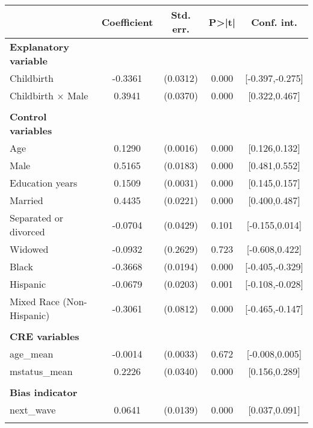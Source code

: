 {
\def\sym#1{\ifmmode^{#1}\else\(^{#1}\)\fi}
\begin{tabular}{l*{1}{cccc}}
\toprule
                    & Coefficient&   Std. err.&       P>|t|&  Conf. int.\\
\midrule
\textbf{Explanatory variable}&            &            &            &            \\
Childbirth          &     -0.3361&    (0.0312)&       0.000&[-0.397,-0.275]\\
Childbirth $\times$ Male&      0.3941&    (0.0370)&       0.000&[0.322,0.467]\\
\\ \textbf{Control variables}&            &            &            &            \\
Age                 &      0.1290&    (0.0016)&       0.000&[0.126,0.132]\\
Male                &      0.5165&    (0.0183)&       0.000&[0.481,0.552]\\
Education years     &      0.1509&    (0.0031)&       0.000&[0.145,0.157]\\
Married             &      0.4435&    (0.0221)&       0.000&[0.400,0.487]\\
Separated or divorced&     -0.0704&    (0.0429)&       0.101&[-0.155,0.014]\\
Widowed             &     -0.0932&    (0.2629)&       0.723&[-0.608,0.422]\\
Black               &     -0.3668&    (0.0194)&       0.000&[-0.405,-0.329]\\
Hispanic            &     -0.0679&    (0.0203)&       0.001&[-0.108,-0.028]\\
Mixed Race (Non-Hispanic)&     -0.3061&    (0.0812)&       0.000&[-0.465,-0.147]\\
\\ \textbf{CRE variables}&            &            &            &            \\
age\_mean            &     -0.0014&    (0.0033)&       0.672&[-0.008,0.005]\\
mstatus\_mean        &      0.2226&    (0.0340)&       0.000&[0.156,0.289]\\
\\ \textbf{Bias indicator}&            &            &            &            \\
next\_wave           &      0.0641&    (0.0139)&       0.000&[0.037,0.091]\\
                    &            &            &            &            \\

\end{tabular}}
